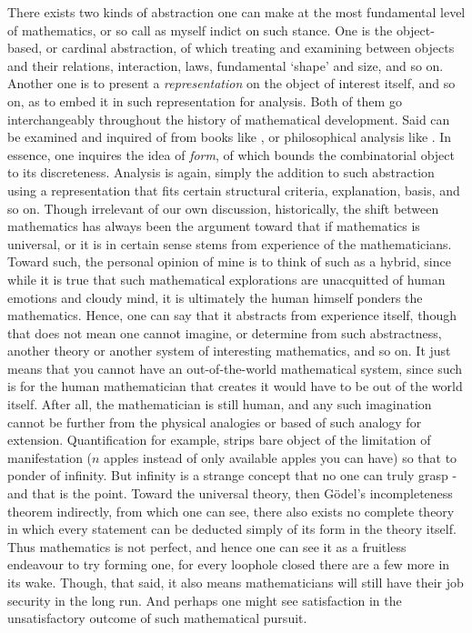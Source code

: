 There exists two kinds of abstraction one can make at the most fundamental level of mathematics, or so call as myself indict on such stance. One is the object-based, or cardinal abstraction, of which treating and examining between objects and their relations, interaction, laws, fundamental `shape' and size, and so on. Another one is to present a \textit{representation}  on the object of interest itself, and so on, as to embed it in such representation for analysis. Both of them go interchangeably throughout the history of mathematical development. Said can be examined and inquired of from books like \cite{10.5555/1513920}, or philosophical analysis like \cite{Shapiro1997-SHAPOM-18,sep-philosophy-mathematics}. In essence, one inquires the idea of \textit{form}, of which bounds the combinatorial object to its discreteness. Analysis is again, simply the addition to such abstraction using a representation that fits certain structural criteria, explanation, basis, and so on. Though irrelevant of our own discussion, historically, the shift between mathematics has always been the argument toward that if mathematics is universal, or it is in certain sense stems from experience of the mathematicians. Toward such, the personal opinion of mine is to think of such as a hybrid, since while it is true that such mathematical explorations are unacquitted of human emotions and cloudy mind, it is ultimately the human himself ponders the mathematics. Hence, one can say that it abstracts from experience itself, though that does not mean one cannot imagine, or determine from such abstractness, another theory or another system of interesting mathematics, and so on. It just means that you cannot have an out-of-the-world mathematical system, since such is for the human mathematician that creates it would have to be out of the world itself. After all, the mathematician is still human, and any such imagination cannot be further from the physical analogies or based of such analogy for extension. Quantification for example, strips bare object of the limitation of manifestation ($n$ apples instead of only available apples you can have) so that to ponder of infinity. But infinity is a strange concept that no one can truly grasp - and that is the point. Toward the universal theory, then Gödel's incompleteness theorem indirectly, from which one can see, there also exists no complete theory in which every statement can be deducted simply of its form in the theory itself. Thus mathematics is not perfect, and hence one can see it as a fruitless endeavour to try forming one, for every loophole closed there are a few more in its wake. Though, that said, it also means mathematicians will still have their job security in the long run. And perhaps one might see satisfaction in the unsatisfactory outcome of such mathematical pursuit. 

